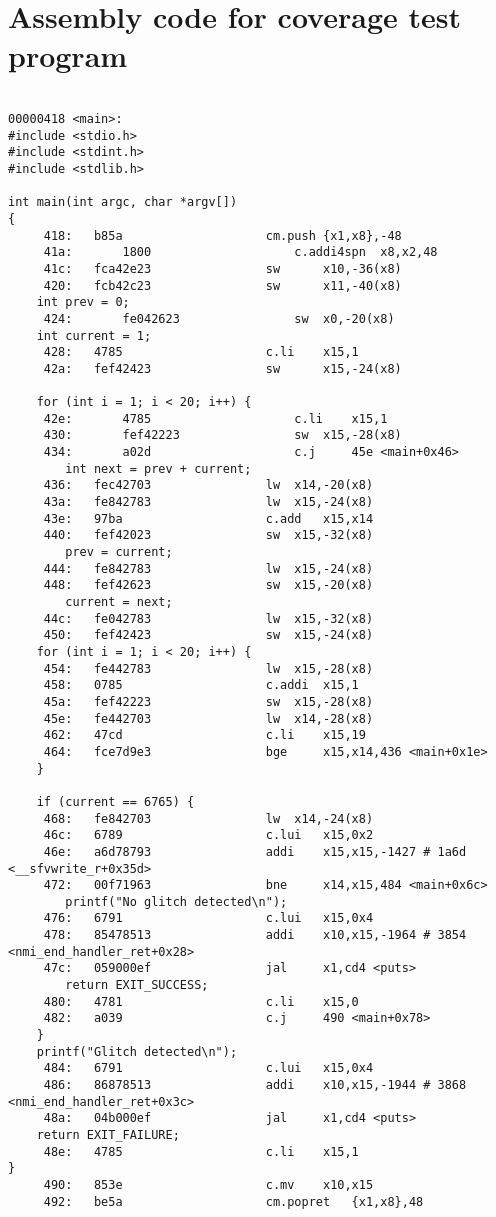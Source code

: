 \section{Assembly code for coverage test program}
\label{app:cov_asm}

\begin{lstlisting}[caption={Assembly code for coverage test program}, label=lst:asm_coverage, language=riscv]

00000418 <main>:
#include <stdio.h>
#include <stdint.h>
#include <stdlib.h>

int main(int argc, char *argv[])
{
     418:	b85a                    cm.push {x1,x8},-48
     41a:       1800                    c.addi4spn	x8,x2,48
     41c:	fca42e23                sw      x10,-36(x8)
     420:	fcb42c23                sw      x11,-40(x8)
    int prev = 0;
     424:       fe042623                sw	x0,-20(x8)
    int current = 1;
     428:	4785                    c.li    x15,1
     42a:	fef42423                sw      x15,-24(x8)

    for (int i = 1; i < 20; i++) {
     42e:       4785                    c.li    x15,1
     430:       fef42223                sw	x15,-28(x8)
     434:       a02d                    c.j     45e <main+0x46>
        int next = prev + current;
     436:	fec42703                lw	x14,-20(x8)
     43a:	fe842783                lw	x15,-24(x8)
     43e:	97ba                    c.add   x15,x14
     440:	fef42023                sw	x15,-32(x8)
        prev = current;
     444:	fe842783                lw	x15,-24(x8)
     448:	fef42623                sw	x15,-20(x8)
        current = next;
     44c:	fe042783                lw	x15,-32(x8)
     450:	fef42423                sw	x15,-24(x8)
    for (int i = 1; i < 20; i++) {
     454:	fe442783                lw	x15,-28(x8)
     458:	0785                    c.addi  x15,1
     45a:	fef42223                sw	x15,-28(x8)
     45e:	fe442703                lw	x14,-28(x8)
     462:	47cd                    c.li    x15,19
     464:	fce7d9e3                bge     x15,x14,436 <main+0x1e>
    }

    if (current == 6765) {
     468:	fe842703                lw	x14,-24(x8)
     46c:	6789                    c.lui   x15,0x2
     46e:	a6d78793                addi    x15,x15,-1427 # 1a6d <__sfvwrite_r+0x35d>
     472:	00f71963                bne     x14,x15,484 <main+0x6c>
        printf("No glitch detected\n");
     476:	6791                    c.lui   x15,0x4
     478:	85478513                addi    x10,x15,-1964 # 3854 <nmi_end_handler_ret+0x28>
     47c:	059000ef                jal     x1,cd4 <puts>
        return EXIT_SUCCESS;
     480:	4781                    c.li    x15,0
     482:	a039                    c.j     490 <main+0x78>
    }
    printf("Glitch detected\n");
     484:	6791                    c.lui   x15,0x4
     486:	86878513                addi    x10,x15,-1944 # 3868 <nmi_end_handler_ret+0x3c>
     48a:	04b000ef                jal     x1,cd4 <puts>
    return EXIT_FAILURE;
     48e:	4785                    c.li    x15,1
}
     490:	853e                    c.mv    x10,x15
     492:	be5a                    cm.popret	{x1,x8},48
\end{lstlisting}

